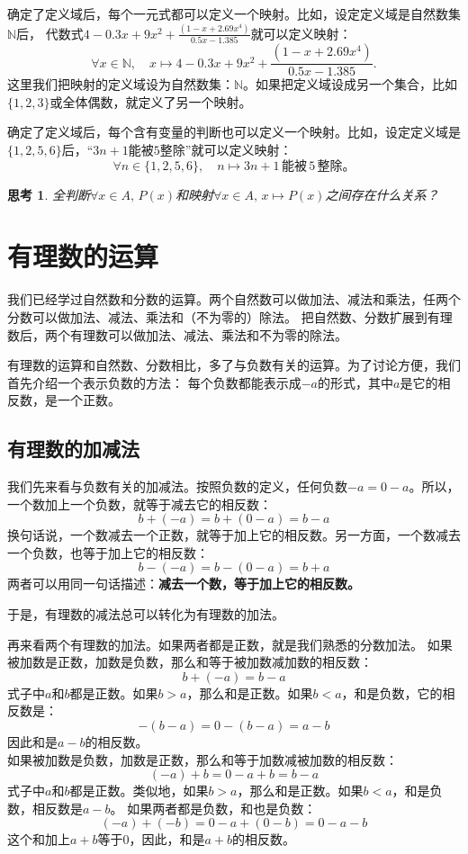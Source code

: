 \documentclass[12pt,UTF8]{ctexbook}
\newtheorem{sk}{思考}[section]
\begin{document}
确定了定义域后，每个一元式都可以定义一个映射。比如，设定定义域是自然数集$\mathbb{N}$后，
代数式$4-0.3x+9x^2+\frac{(1-x+2.69x^4)}{0.5x-1.385}$就可以定义映射：
$$ \forall x\in\mathbb{N}, \quad x \mapsto 4-0.3x+9x^2+\frac{(1-x+2.69x^4)}{0.5x-1.385}. $$
这里我们把映射的定义域设为自然数集：$\mathbb{N}$。如果把定义域设成另一个集合，比如$\{1,2,3\}$或全体偶数，就定义了另一个映射。

确定了定义域后，每个含有变量的判断也可以定义一个映射。比如，设定定义域是$\{1,2,5,6\}$后，“$3n+1$能被$5$整除”就可以定义映射：
$$ \forall n\in \{1,2,5,6\} , \quad n \mapsto 3n+1\,\mbox{能被}\,5\,\mbox{整除。} $$

\begin{sk}\label{sk:2-0-2}
    全判断$\forall x \in A, \, P(x)$和映射$\forall x\in A, \, x \mapsto P(x)$之间存在什么关系？
\end{sk}

\chapter{有理数的运算}
我们已经学过自然数和分数的运算。两个自然数可以做加法、减法和乘法，任两个分数可以做加法、减法、乘法和（不为零的）除法。
把自然数、分数扩展到有理数后，两个有理数可以做加法、减法、乘法和不为零的除法。

有理数的运算和自然数、分数相比，多了与负数有关的运算。为了讨论方便，我们首先介绍一个表示负数的方法：
每个负数都能表示成$-a$的形式，其中$a$是它的相反数，是一个正数。

\section{有理数的加减法}
我们先来看与负数有关的加减法。按照负数的定义，任何负数$-a = 0 - a$。所以，一个数加上一个负数，就等于减去它的相反数：
$$ b + (-a) = b + (0 - a) = b - a$$
换句话说，一个数减去一个正数，就等于加上它的相反数。另一方面，一个数减去一个负数，也等于加上它的相反数：
$$ b - (-a) = b - (0 - a) = b + a$$
两者可以用同一句话描述：\textbf{减去一个数，等于加上它的相反数。}

于是，有理数的减法总可以转化为有理数的加法。

再来看两个有理数的加法。如果两者都是正数，就是我们熟悉的分数加法。
如果被加数是正数，加数是负数，那么和等于被加数减加数的相反数：
$$ b + (-a) = b - a$$
式子中$a$和$b$都是正数。如果$b > a$，那么和是正数。如果$b < a$，和是负数，它的相反数是：
$$ -(b - a) = 0 - (b - a) = a - b$$
因此和是$a - b$的相反数。\\
如果被加数是负数，加数是正数，那么和等于加数减被加数的相反数：
$$ (-a) + b = 0 - a + b = b - a$$
式子中$a$和$b$都是正数。类似地，如果$b > a$，那么和是正数。如果$b < a$，和是负数，相反数是$a - b$。
如果两者都是负数，和也是负数：
$$ (-a) + (-b) = 0 - a + (0 - b) = 0 - a - b$$
这个和加上$a + b$等于$0$，因此，和是$a + b$的相反数。
\end{document}
